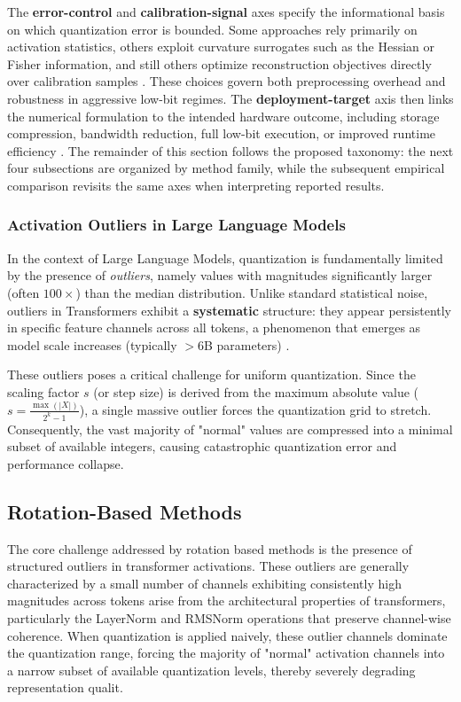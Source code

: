 The \textbf{error-control} and \textbf{calibration-signal} axes specify the informational basis on which quantization error is bounded. Some approaches rely primarily on activation statistics, others exploit curvature surrogates such as the Hessian or Fisher information, and still others optimize reconstruction objectives directly over calibration samples \cite{lee2024owq,frantar2022gptq,guan2024aptq,shao2023omniquant}. These choices govern both preprocessing overhead and robustness in aggressive low-bit regimes. The \textbf{deployment-target} axis then links the numerical formulation to the intended hardware outcome, including storage compression, bandwidth reduction, full low-bit execution, or improved runtime efficiency \cite{lin2024awq,dettmers2023spqr,liu2024vptq}. The remainder of this section follows the proposed taxonomy: the next four subsections are organized by method family, while the subsequent empirical comparison revisits the same axes when interpreting reported results.


\subsubsection{Activation Outliers in Large Language Models}
In the context of Large Language Models, quantization is fundamentally limited by the presence of \textit{outliers}, namely values with magnitudes significantly larger (often $100\times$) than the median distribution. Unlike standard statistical noise, outliers in Transformers exhibit a \textbf{systematic} structure: they appear persistently in specific feature channels across all tokens, a phenomenon that emerges as model scale increases (typically $>6$B parameters) \cite{dettmers2022llmint8}.

These outliers poses a critical challenge for uniform quantization. Since the scaling factor $s$ (or step size) is derived from the maximum absolute value ($s = \frac{\max(|X|)}{2^k-1}$), a single massive outlier forces the quantization grid to stretch. Consequently, the vast majority of "normal" values are compressed into a minimal subset of available integers, causing catastrophic quantization error and performance collapse.


\subsection{Rotation-Based Methods}

The core challenge addressed by rotation based methods is the presence of structured outliers in transformer activations. These outliers are generally characterized by a small number of channels exhibiting consistently high magnitudes across tokens arise from the architectural properties of transformers, particularly the LayerNorm and RMSNorm operations that preserve channel-wise coherence. When quantization is applied naively, these outlier channels dominate the quantization range, forcing the majority of "normal" activation channels into a narrow subset of available quantization levels, thereby severely degrading representation qualit.

